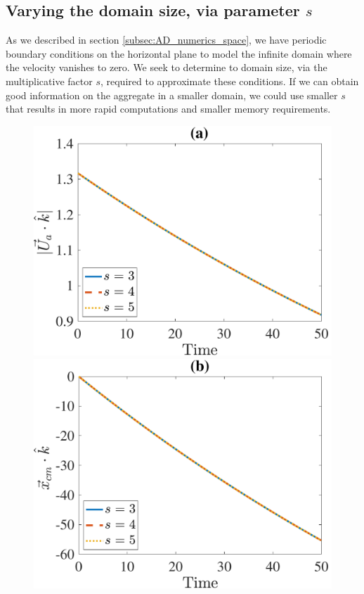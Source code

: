 \subsection{Varying the domain size, via parameter $s$}
As we described in section \ref{subsec:AD_numerics_space}, we have periodic boundary conditions on the horizontal plane to model the infinite domain where the velocity vanishes to zero. 
We seek to determine to domain size, via the multiplicative factor $s$, required to approximate these conditions.
If we can obtain good information on the aggregate in a smaller domain, we could use smaller $s$ that results in more rapid computations and smaller memory requirements. 
\begin{figure}[ht]
	\begin{center}
		\includegraphics[scale=0.35]{./figures/fig_NC10_s_Ua3_all}
		\includegraphics[scale=0.35]{./figures/fig_NC10_s_cm3_all}

\end{center}
\end{figure}
